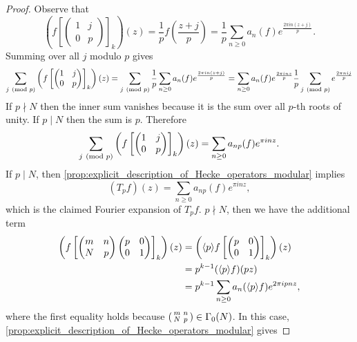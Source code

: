       \begin{proof}
        Observe that
        \[
          \left(f\left[\begin{pmatrix} 1 & j \\ 0 & p \end{pmatrix}\right]_{k}\right)(z) = \frac{1}{p}f\left(\frac{z+j}{p}\right) = \frac{1}{p}\sum_{n \ge 0}a_{n}(f)e^{\frac{2\pi in(z+j)}{p}}.
        \]
        Summing over all $j$ modulo $p$ gives
        \[
          \sum_{j \ \left(\text{mod }p\right)}\left(f\left[\begin{pmatrix} 1 & j \\ 0 & p \end{pmatrix}\right]_{k}\right)(z) = \sum_{j \ \left(\text{mod }p\right)}\frac{1}{p}\sum_{n \ge 0}a_{n}(f)e^{\frac{2\pi in(z+j)}{p}} = \sum_{n \ge 0}a_{n}(f)e^{\frac{2\pi inz}{p}}\frac{1}{p}\sum_{j \ \left(\text{mod }p\right)}e^{\frac{2\pi nij}{p}}
        \]
        If $p \nmid N$ then the inner sum vanishes because it is the sum over all $p$-th roots of unity. If $p \mid N$ then the sum is $p$. Therefore
        \[
          \sum_{j \ \left(\text{mod }p\right)}\left(f\left[\begin{pmatrix} 1 & j \\ 0 & p \end{pmatrix}\right]_{k}\right)(z) = \sum_{n \ge 0}a_{np}(f)e^{\pi inz}.
        \]
        If $p \mid N$, then \cref{prop:explicit_description_of_Hecke_operators_modular} implies
        \[
          (T_{p}f)(z) = \sum_{n \ge 0}a_{np}(f)e^{\pi inz},
        \]
        which is the claimed Fourier expansion of $T_{p}f$. $p \nmid N$, then we have the additional term
        \begin{align*}
          \left(f\left[\begin{pmatrix} m & n \\ N & p \end{pmatrix}\begin{pmatrix} p & 0 \\ 0 & 1 \end{pmatrix}\right]_{k}\right)(z) &= \left(\langle p\rangle f\left[\begin{pmatrix} p & 0 \\ 0 & 1 \end{pmatrix}\right]_{k}\right)(z) \\
          &= p^{k-1}(\langle p\rangle f)(pz) \\
          &= p^{k-1}\sum_{n \ge 0}a_{n}(\langle p\rangle f)e^{2\pi ipnz},
        \end{align*}
        where the first equality holds because $\begin{psmallmatrix} m & n \\ N & p \end{psmallmatrix} \in \Gamma_{0}(N)$. In this case, \cref{prop:explicit_description_of_Hecke_operators_modular} gives

\end{proof}

